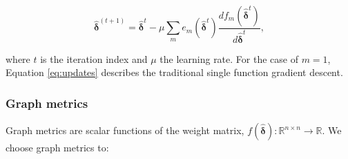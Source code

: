 \documentclass[12pt,a4paper,english]{article}
\begin{document}
\begin{equation}
\bm{\hat{\delta}}^{(t+1)} = \bm{\hat{\delta}}^t-\mu\sum_m e_m(\bm{\hat{\delta}}^t)\frac{df_m(\bm{\hat{\delta}}^t)}{d\bm{\hat{\delta}}^t},
\label{eq:updates}
\end{equation}

where $t$ is the iteration index and $\mu$ the learning rate. For the case of $m=1$, Equation \ref{eq:updates} describes the traditional single function gradient descent. 

\subsubsection{Graph metrics}
Graph metrics are scalar functions of the weight matrix, $f(\bm{\hat{\delta}}): \mathbb{R}^{n \times n}\rightarrow \mathbb{R}$. We choose graph metrics to:
\end{document}
